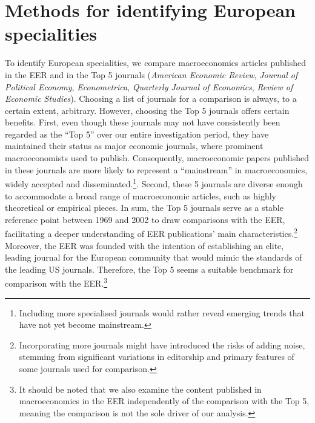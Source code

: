 \documentclass[
  12pt,
  onecolumn]{article}
\begin{document}
\hypertarget{methods}{%
\section{Methods for identifying European specialities}\label{methods}}

To identify European specialities, we compare macroeconomics articles
published in the EER and in the Top 5 journals (\emph{American Economic
Review}, \emph{Journal of Political Economy}, \emph{Econometrica},
\emph{Quarterly Journal of Economics}, \emph{Review of Economic
Studies}). Choosing a list of journals for a comparison is always, to a
certain extent, arbitrary. However, choosing the Top 5 journals offers
certain benefits. First, even though these journals may not have
consistently been regarded as the ``Top 5'' over our entire
investigation period, they have maintained their status as major
economic journals, where prominent macroeconomists used to publish.
Consequently, macroeconomic papers published in these journals are more
likely to represent a ``mainstream'' in macroeconomics, widely accepted
and disseminated.\footnote{Including more specialised journals would
  rather reveal emerging trends that have not yet become mainstream.}.
Second, these 5 journals are diverse enough to accommodate a broad range
of macroeconomic articles, such as highly theoretical or empirical
pieces. In sum, the Top 5 journals serve as a stable reference point
between 1969 and 2002 to draw comparisons with the EER, facilitating a
deeper understanding of EER publications' main
characteristics.\footnote{Incorporating more journals might have
  introduced the risks of adding noise, stemming from significant
  variations in editorship and primary features of some journals used
  for comparison.} Moreover, the EER was founded with the intention of
establishing an elite, leading journal for the European community that
would mimic the standards of the leading US journals. Therefore, the Top
5 seems a suitable benchmark for comparison with the EER.\footnote{It
  should be noted that we also examine the content published in
  macroeconomics in the EER independently of the comparison with the Top
  5, meaning the comparison is not the sole driver of our analysis.}
\end{document}

